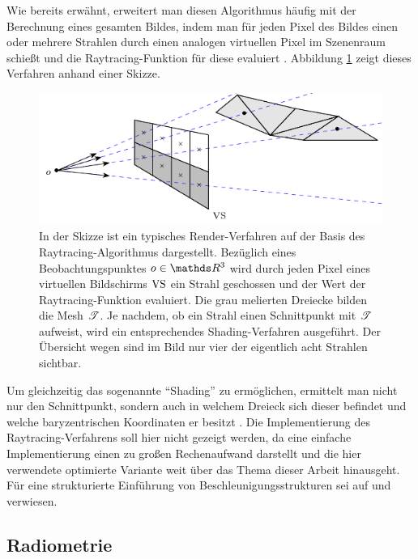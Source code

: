 		Wie bereits erwähnt, erweitert man diesen Algorithmus häufig mit der Berechnung eines gesamten Bildes, indem man für jeden Pixel des Bildes einen oder mehrere Strahlen durch einen analogen virtuellen Pixel im Szenenraum schießt und die Raytracing-Funktion für diese evaluiert \cite{pbrt3,parker-ray-tracing,nikodym-ray-tracing}.
		Abbildung \ref{fig:ray_tracing-2} zeigt dieses Verfahren anhand einer Skizze.
		\begin{figure}[h]
			\center
			\includegraphics{gg_fig/ray_tracing_2.pdf}
			\caption{In der Skizze ist ein typisches Render-Verfahren auf der Basis des Raytracing-Algorithmus dargestellt. Bezüglich eines Beobachtungspunktes $o\in\SR^3$ wird durch jeden Pixel eines virtuellen Bildschirms $\mathrm{VS}$ ein Strahl geschossen und der Wert der Raytracing-Funktion evaluiert. Die grau melierten Dreiecke bilden die Mesh $\mathscr{T}$. Je nachdem, ob ein Strahl einen Schnittpunkt mit $\mathscr{T}$ aufweist, wird ein entsprechendes Shading-Verfahren ausgeführt. Der Übersicht wegen sind im Bild nur vier der eigentlich acht Strahlen sichtbar.}
			\label{fig:ray_tracing-2}
		\end{figure}
		Um gleichzeitig das sogenannte \enquote{Shading} zu ermöglichen, ermittelt man nicht nur den Schnittpunkt, sondern auch in welchem Dreieck sich dieser befindet und welche baryzentrischen Koordinaten er besitzt \cite{pbrt3,ray-triangle-intersection}.
		Die Implementierung des Raytracing-Verfahrens soll hier nicht gezeigt werden, da eine einfache Implementierung einen zu großen Rechenaufwand darstellt und die hier verwendete optimierte Variante weit über das Thema dieser Arbeit hinausgeht.
		Für eine strukturierte Einführung von Beschleunigungsstrukturen sei auf \cite[S.~247~ff]{pbrt3} und \cite{parker-ray-tracing,nikodym-ray-tracing} verwiesen.


	\subsection{Radiometrie} %
	\label{sub:radiometrie}

